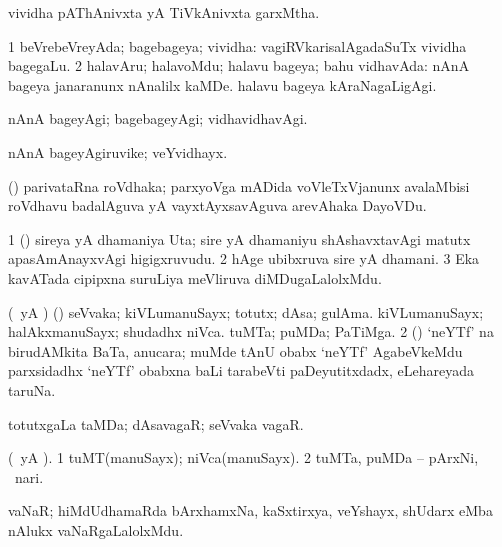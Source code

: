 \bentry
{} 
\gl{\nA}
\expl{}
\bmng
 vividha pAThAnivxta yA TiVkAnivxta garxMtha. 
\emng
\eentry

\bentry
{} 
\gl{\gu}
\expl{}
\bmng
\bnum
\num{1} beVrebeVreyAda; bagebageya; vividha:  vagiRVkarisalAgadaSuTx vividha bagegaLu. 
\num{2} halavAru; halavoMdu; halavu bageya; bahu vidhavAda:  nAnA bageya janaranunx nAnalilx kaMDe.  halavu bageya kAraNagaLigAgi. 
\enum
\emng
\eentry

\bentry
{} 
\gl{\kirxvi}
\expl{}
\bmng
 nAnA bageyAgi; bagebageyAgi; vidhavidhavAgi. 
\emng
\eentry

\bentry
{} 
\gl{\nA}
\expl{}
\bmng
 nAnA bageyAgiruvike; veYvidhayx. 
\emng
\eentry

\bentry
{} 
\gl{\nA}
\expl{}
\bmng
 (\viduyx) parivataRna roVdhaka; parxyoVga mADida voVleTxVjanunx avalaMbisi roVdhavu badalAguva yA vayxtAyxsavAguva arevAhaka DayoVDu. 
\emng
\eentry

\bentry
{} 
\gl{\nA}
\bmng
\bnum
\num{1} (\veYshA) sireya yA dhamaniya Uta; sire yA dhamaniyu shAshavxtavAgi matutx apasAmAnayxvAgi higigxruvudu. 
\num{2} hAge ubibxruva sire yA dhamani. 
\num{3} Eka kavATada cipipxna suruLiya meVliruva diMDugaLalolxMdu. 
\enum
\emng
\eentry

\bentry
{} 
\gl{\nA}
\bmng
\bnum
{} (\pArxparx\ yA \hA) 
\banum
{} (\hiV) seVvaka; kiVLumanuSayx; totutx; dAsa; gulAma. 
 kiVLumanuSayx; halAkxmanuSayx; shudadhx niVca. 
 tuMTa; puMDa; PaTiMga. 
\eanum
\numie
\num{2} (\ca) `neYTf' na birudAMkita BaTa, anucara; muMde tAnU obabx `neYTf' AgabeVkeMdu parxsidadhx `neYTf' obabxna baLi tarabeVti paDeyutitxdadx, eLehareyada taruNa. 
\enum
\emng
\eentry

\bentry
{} 
\gl{\nA}
\expl{}
\bmng
 totutxgaLa taMDa; dAsavagaR; seVvaka vagaR. 
\emng
\eentry

\bentry
{} 
\gl{\nA}
\expl{}
\bmng
 (\pArxM\ yA \ame). 
\bnum
\num{1} tuMT(manuSayx); niVca(manuSayx). 
\num{2} tuMTa, puMDa -- pArxNi, \kanmu\ nari. 
\enum
\emng
\eentry

\bentry
{} 
\gl{\nA}
\expl{}
\bmng
 vaNaR; hiMdUdhamaRda bArxhamxNa, kaSxtirxya, veYshayx, shUdarx eMba nAlukx vaNaRgaLalolxMdu. 
\emng
\eentry

